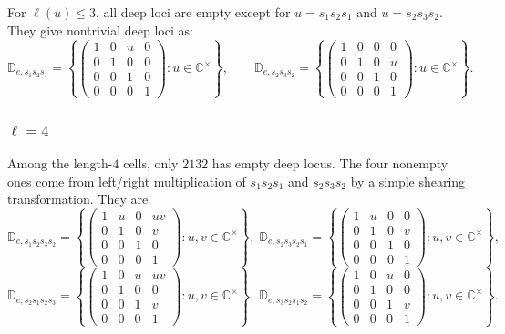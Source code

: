 \documentclass[12pt]{amsart}
\newcommand{\C}{\mathbb C}
\newcommand{\D}{\mathbb D}
\theoremstyle{plain}
\theoremstyle{definition}
\theoremstyle{remark}
\begin{document}
For $\ell(u)\le 3$, all deep loci are empty except for $u=s_1s_2s_1$ and $u=s_2s_3s_2$.  They give nontrivial deep loci as:
\[
\D_{e,s_1s_2s_1}=
\left\{
\begin{pmatrix}
1&0&u&0\\
0&1&0&0\\
0&0&1&0\\
0&0&0&1
\end{pmatrix}
:u\in\C^{\times}
\right\},
\qquad
\D_{e,s_2s_3s_2}=
\left\{
\begin{pmatrix}
1&0&0&0\\
0&1&0&u\\
0&0&1&0\\
0&0&0&1
\end{pmatrix}
:u\in\C^{\times}
\right\}.
\]

\subsubsection*{$\ell=4$}

Among the length-$4$ cells, only $2132$ has empty deep locus.  The four nonempty ones come from left/right multiplication of $s_1s_2s_1$ and $s_2s_3s_2$ by a simple shearing transformation.  They are
\[
\D_{e,s_1s_2s_3s_2}=
\left\{
\begin{pmatrix}
1&u&0&uv\\
0&1&0&v\\
0&0&1&0\\
0&0&0&1
\end{pmatrix}
:u,v\in\C^{\times}
\right\},
\;
\D_{e,s_2s_3s_2s_1}=
\left\{
\begin{pmatrix}
1&u&0&0\\
0&1&0&v\\
0&0&1&0\\
0&0&0&1
\end{pmatrix}
:u,v\in\C^{\times}
\right\},
\]
\[
\D_{e,s_2s_1s_2s_3}=
\left\{
\begin{pmatrix}
1&0&u&uv\\
0&1&0&0\\
0&0&1&v\\
0&0&0&1
\end{pmatrix}
:u,v\in\C^{\times}
\right\},
\;
\D_{e,s_3s_2s_1s_2}=
\left\{
\begin{pmatrix}
1&0&u&0\\
0&1&0&0\\
0&0&1&v\\
0&0&0&1
\end{pmatrix}
:u,v\in\C^{\times}
\right\}.
\]
\end{document}
